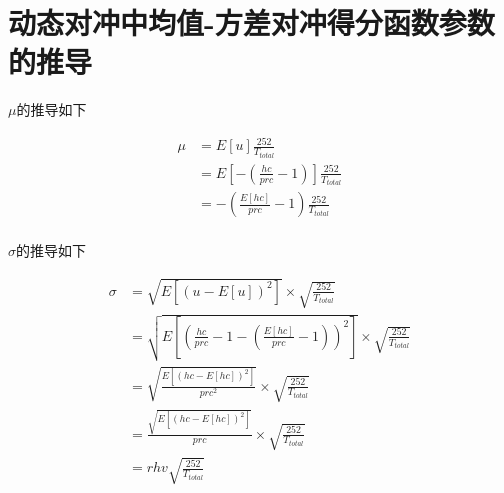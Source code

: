
\chapter{动态对冲中均值-方差对冲得分函数参数的推导}
\label{app:eq}

$\mu$的推导如下

\begin{equation}
  \begin{aligned}
    \mu&=E[u]\frac{252}{T_{total}}\\
    &=E[-(\frac{hc}{prc}-1)]\frac{252}{T_{total}}\\
    &=-(\frac{E[hc]}{prc}-1)\frac{252}{T_{total}}\\
  \end{aligned}
\end{equation}

$\sigma$的推导如下

\begin{equation}
  \begin{aligned}
    \sigma&=\sqrt{E[(u-E[u])^2]}\times\sqrt{\frac{252}{T_{total}}}\\
    &=\sqrt{E[(\frac{hc}{prc}-1-(\frac{E[hc]}{prc}-1))^2]}\times\sqrt{\frac{252}{T_{total}}}\\
    &=\sqrt{\frac{E[(hc-E[hc])^2]}{prc^2}}\times\sqrt{\frac{252}{T_{total}}}\\
    &=\frac{\sqrt{E[(hc-E[hc])^2]}}{prc}\times\sqrt{\frac{252}{T_{total}}}\\
    &=rhv\sqrt{\frac{252}{T_{total}}}\\
  \end{aligned}
\end{equation}
